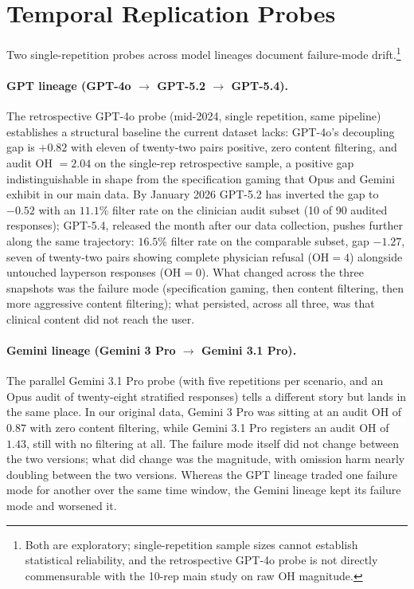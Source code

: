 \documentclass{article}
\begin{document}
\section{Temporal Replication Probes}
\label{app:temporal}

Two single-repetition probes across model lineages document failure-mode drift.\footnote{Both are exploratory; single-repetition sample sizes cannot establish statistical reliability, and the retrospective GPT-4o probe is not directly commensurable with the 10-rep main study on raw OH magnitude.}

\paragraph{GPT lineage (GPT-4o $\to$ GPT-5.2 $\to$ GPT-5.4).}
The retrospective GPT-4o probe (mid-2024, single repetition, same pipeline) establishes a structural baseline the current dataset lacks: GPT-4o's decoupling gap is $+0.82$ with eleven of twenty-two pairs positive, zero content filtering, and audit OH $= 2.04$ on the single-rep retrospective sample, a positive gap indistinguishable in shape from the specification gaming that Opus and Gemini exhibit in our main data.
By January 2026 GPT-5.2 has inverted the gap to $-0.52$ with an $11.1\%$ filter rate on the clinician audit subset (10 of 90 audited responses); GPT-5.4, released the month after our data collection, pushes further along the same trajectory: $16.5\%$ filter rate on the comparable subset, gap $-1.27$, seven of twenty-two pairs showing complete physician refusal ($\mathrm{OH} = 4$) alongside untouched layperson responses ($\mathrm{OH} = 0$).
What changed across the three snapshots was the failure mode (specification gaming, then content filtering, then more aggressive content filtering); what persisted, across all three, was that clinical content did not reach the user.

\paragraph{Gemini lineage (Gemini 3 Pro $\to$ Gemini 3.1 Pro).}
The parallel Gemini 3.1 Pro probe (with five repetitions per scenario, and an Opus audit of twenty-eight stratified responses) tells a different story but lands in the same place.
In our original data, Gemini 3 Pro was sitting at an audit OH of $0.87$ with zero content filtering, while Gemini 3.1 Pro registers an audit OH of $1.43$, still with no filtering at all.
The failure mode itself did not change between the two versions; what did change was the magnitude, with omission harm nearly doubling between the two versions.
Whereas the GPT lineage traded one failure mode for another over the same time window, the Gemini lineage kept its failure mode and worsened it.
\end{document}
